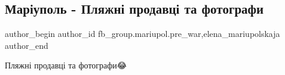  
 
 
 
 

\subsection{Маріуполь - Пляжні продавці та фотографи}
\label{sec:24_01_2023.fb.fb_group.mariupol.pre_war.2.mar_upol___plyazhn__}
 
\ifcmt
 author_begin
   author_id fb_group.mariupol.pre_war,elena_mariupolskaja
 author_end
\fi

Пляжні продавці та фотографи😂
